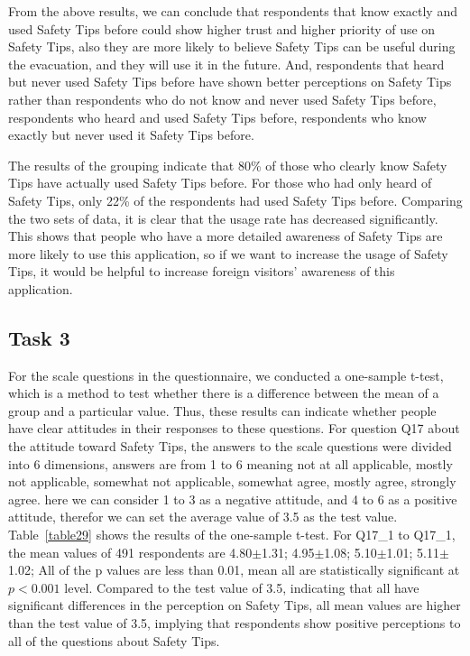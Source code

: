 From the above results, we can conclude that respondents that know exactly and used Safety Tips before could show higher trust and higher priority of use on Safety Tips, also they are more likely to believe Safety Tips can be useful during the evacuation, and they will use it in the future. And, respondents that heard but never used  Safety Tips before have shown better perceptions on Safety Tips rather than respondents who do not know and never used  Safety Tips before, respondents who heard and used Safety Tips before, respondents who know exactly but never used it Safety Tips before.

The results of the grouping indicate that 80\% of those who clearly know Safety Tips have actually used Safety Tips before. For those who had only heard of Safety Tips, only 22\% of the respondents had used Safety Tips before. Comparing the two sets of data, it is clear that the usage rate has decreased significantly. This shows that people who have a more detailed awareness of Safety Tips are more likely to use this application, so if we want to increase the usage of Safety Tips, it would be helpful to increase foreign visitors' awareness of this application.

\subsection{Task 3}
\label{task3}
For the scale questions in the questionnaire, we conducted a one-sample t-test, which is a method to test whether there is a difference between the mean of a group and a particular value. Thus, these results can indicate whether people have clear attitudes in their responses to these questions. For question Q17 about the attitude toward Safety Tips, the answers to the scale questions were divided into 6 dimensions, answers are from 1 to 6 meaning not at all applicable, mostly not applicable, somewhat not applicable, somewhat agree, mostly agree, strongly agree. here we can consider 1 to 3 as a negative attitude, and 4 to 6 as a positive attitude, therefor we can set the average value of 3.5 as the test value. Table~\ref{table29} shows the results of the one-sample t-test. For Q17\_1 to Q17\_1, the mean values of 491 respondents are 4.80$\pm$1.31; 4.95$\pm$1.08; 5.10$\pm$1.01; 5.11$\pm$1.02; All of the p values are less than 0.01, mean all are statistically significant at $p<0.001$ level. Compared to the test value of 3.5, indicating that all have significant differences in the perception on Safety Tips, all mean values are higher than the test value of 3.5, implying that respondents show positive perceptions to all of the questions about Safety Tips. 

